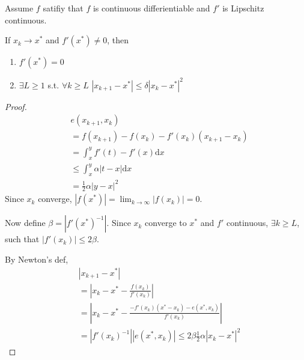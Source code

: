 Assume $f$ satifiy that $f$ is continuous differientiable
and $f'$ is Lipschitz continuous.

\begin{theorem}
  If ${x_k} \rightarrow x^*$ and $f'(x^*) \neq 0$, then
  \begin{enumerate}
    \item $f'(x^*) = 0$
    \item $\exists L \geq 1$ s.t. $\forall k \geq L$
    $ |x_{k+1} - x^*| \leq \delta |x_k - x^*|^2 $
  \end{enumerate}
\end{theorem}
\begin{proof}
  \begin{align}
    &e(x_{k+1}, x_k) \nonumber \\
    &= f(x_{k+1}) - f(x_k) - f'(x_k)(x_{k+1} - x_k) \nonumber \\
    &= \int_x^y f'(t) - f'(x) \mathrm{d}x \nonumber \\
    &\leq \int_x^y \alpha |t - x| \mathrm{d}x \nonumber \\
    &=\frac{1}{2} \alpha |y-x|^2 \nonumber
  \end{align}
  Since ${x_k}$ converge, $|f(x^*)| = \lim_{k \rightarrow \infty}|f(x_k)| = 0$.

  Now define $\beta = |f'(x^*)^{-1}|$.
  Since ${x_k}$ converge to $x^*$ and $f'$ continuous, $\exists k \geq L$,
  such that $|f'(x_k)| \leq 2\beta$.
  
  By Newton's def,
  \begin{align}
    &|x_{k+1} - x^*| \nonumber \\
    &= |x_k - x^* - \frac{f(x_k)}{f'(x_k)}| \nonumber \\
    &= |x_k - x^* - \frac{-f'(x_k)(x^* - x_k) - e(x^*, x_k)}{f'(x_k)}| \nonumber \\ 
    &= |f'(x_k)^{-1}||e(x^*, x_k)|
    \leq 2\beta \frac{1}{2}\alpha |x_k - x^*|^2
  \end{align}
\end{proof}
